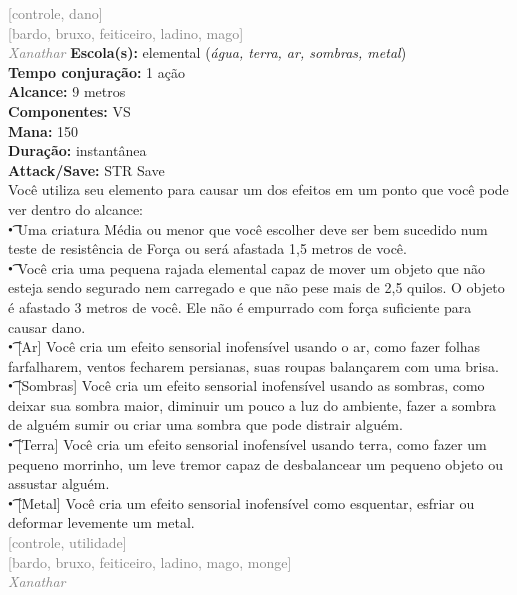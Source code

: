 \documentclass{RPG_Adventure}[2021/10/20]
\begin{document}
{\scriptsize \textcolor{gray}{[controle, dano]\\}}
{\scriptsize \textcolor{gray}{[bardo, bruxo, feiticeiro, ladino, mago]\\}}
{\tiny \textcolor{gray}{\textit{Xanathar}}}
{\small \t \textbf{Escola(s):} elemental (\textit{água, terra, ar, sombras, metal})\\\t \textbf{Tempo conjuração:} 1 ação\\\t \textbf{Alcance:} 9 metros\\\t \textbf{Componentes:} VS\\\t \textbf{Mana:} 150\\\t \textbf{Duração:} instantânea\\\t \textbf{Attack/Save:} STR Save\\}
{\normalsize Você utiliza seu elemento para causar um dos efeitos em um ponto que você pode ver dentro do alcance:\\\t • Uma criatura Média ou menor que você escolher deve ser bem sucedido num teste de resistência de Força ou será afastada 1,5 metros de você.\\\t • Você cria uma pequena rajada elemental capaz de mover um objeto que não esteja sendo segurado nem carregado e que não pese mais de 2,5 quilos. O objeto é afastado 3 metros de você. Ele não é empurrado com força suficiente para causar dano.\\\t • [Ar] Você cria um efeito sensorial inofensível usando o ar, como fazer folhas farfalharem, ventos fecharem persianas, suas roupas balançarem com uma brisa.\\\t • [Sombras] Você cria um efeito sensorial inofensível usando as sombras, como deixar sua sombra maior, diminuir um pouco a luz do ambiente, fazer a sombra de alguém sumir ou criar uma sombra que pode distrair alguém.\\\t • [Terra] Você cria um efeito sensorial inofensível usando terra, como fazer um pequeno morrinho, um leve tremor capaz de desbalancear um pequeno objeto ou assustar alguém.\\\t • [Metal] Você cria um efeito sensorial inofensível como esquentar, esfriar ou deformar levemente um metal.\\}
{\scriptsize \textcolor{gray}{[controle, utilidade]\\}}
{\scriptsize \textcolor{gray}{[bardo, bruxo, feiticeiro, ladino, mago, monge]\\}}
{\tiny \textcolor{gray}{\textit{Xanathar}}}
\end{document}

